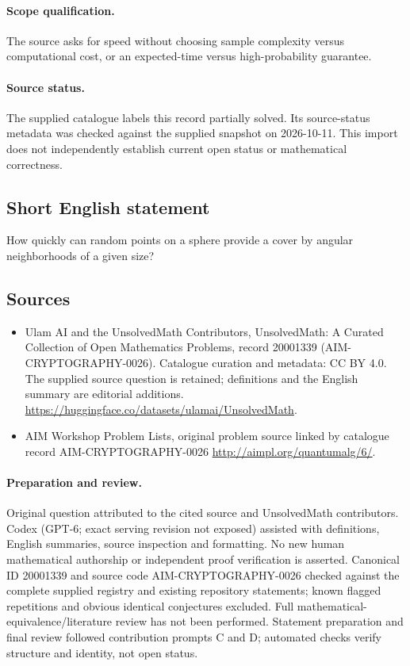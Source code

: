 \documentclass[11pt]{article}
\begin{document}
\paragraph{Scope qualification.}
The source asks for speed without choosing sample complexity versus computational cost, or an expected-time versus high-probability guarantee.
\paragraph{Source status.}
The supplied catalogue labels this record partially solved. Its source-status metadata was checked against the supplied snapshot on 2026-10-11. This import does not independently establish current open status or mathematical correctness.
\subsection{Short English statement}
How quickly can random points on a sphere provide a cover by angular neighborhoods of a given size?
\subsection{Sources}
\begin{itemize}
\item[S1] Ulam AI and the UnsolvedMath Contributors, UnsolvedMath: A Curated Collection of Open Mathematics Problems, record 20001339 (AIM-CRYPTOGRAPHY-0026). Catalogue curation and metadata: CC BY 4.0. The supplied source question is retained; definitions and the English summary are editorial additions.
\url{https://huggingface.co/datasets/ulamai/UnsolvedMath}.
\item[S2] AIM Workshop Problem Lists, original problem source linked by catalogue record AIM-CRYPTOGRAPHY-0026
\url{http://aimpl.org/quantumalg/6/}.
\end{itemize}
\paragraph{Preparation and review.}
Original question attributed to the cited source and UnsolvedMath contributors. Codex (GPT-6; exact serving revision not exposed) assisted with definitions, English summaries, source inspection and formatting. No new human mathematical authorship or independent proof verification is asserted. Canonical ID 20001339 and source code AIM-CRYPTOGRAPHY-0026 checked against the complete supplied registry and existing repository statements; known flagged repetitions and obvious identical conjectures excluded. Full mathematical-equivalence/literature review has not been performed. Statement preparation and final review followed contribution prompts C and D; automated checks verify structure and identity, not open status.
\label{end:20001339}
\end{document}
